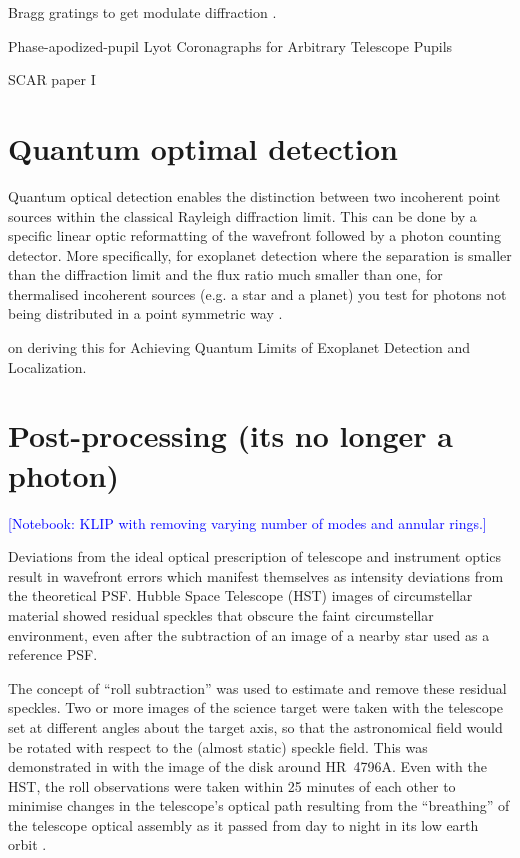 \documentclass[letterpaper]{ar-1col}
\newcommand{\notebooksuggestion}[1]{\textcolor{blue}{[Notebook: #1]}}
\begin{document}

Bragg gratings to get modulate diffraction \citep{FaggingerAuer24}.

Phase-apodized-pupil Lyot Coronagraphs for Arbitrary Telescope Pupils \citep{Por20}

SCAR paper I \citep{Por20a}

\section{Quantum optimal detection}

Quantum optical detection \citep{Lu18} enables the distinction between two incoherent point sources within the classical Rayleigh diffraction limit.
%
This can be done by a specific linear optic reformatting of the wavefront followed by a photon counting detector.
%
More specifically, for exoplanet detection where the separation is smaller than the diffraction limit and the flux ratio much smaller than one, for thermalised incoherent sources (e.g. a star and a planet) you test for photons not being distributed in a point symmetric way \citep[e.g. ][]{Huang21}.

\citet{Desai23} on deriving this for Achieving Quantum Limits of Exoplanet Detection and Localization.

\section{Post-processing (its no longer a photon)}

\notebooksuggestion{KLIP with removing varying number of modes and annular rings.}

Deviations from the ideal optical prescription of telescope and instrument optics result in wavefront errors which manifest themselves as intensity deviations from the theoretical PSF.
%
Hubble Space Telescope (HST) images of circumstellar material showed residual speckles that obscure the faint circumstellar environment, even after the subtraction of an image of a nearby star used as a reference PSF.

The concept of ``roll subtraction''  \citep{Schneider98} was used to estimate and remove these residual speckles.
%
Two or more images of the science target were taken with the telescope set at different angles about the target axis, so that the astronomical field would be rotated with respect to the (almost static) speckle field.
%
This was demonstrated in \citet{Schneider99} with the image of the disk around HR~4796A.
%
Even with the HST, the roll observations were taken within 25 minutes of each other to minimise changes in the telescope's optical path resulting from the ``breathing'' of the telescope optical assembly as it passed from day to night in its low earth orbit \citep{Bely93}.
\end{document}
